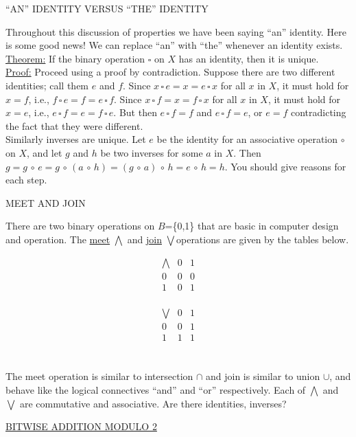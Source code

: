 \documentclass[12pt]{article}
\theoremstyle{definition}
\begin{document}
\centerline{``AN'' IDENTITY VERSUS ``THE'' IDENTITY}
Throughout this discussion of properties we have been saying ``an'' identity.  Here is some good news!  We can replace ``an'' with ``the'' whenever an identity exists.\\[.5in]
\underline{Theorem:} If the binary operation $\square$ on $X$ has an identity, then it is unique.\\
\underline{Proof:} Proceed using a proof by contradiction.  Suppose there are two different identities; call them $e$ and $f$.  Since $x\,\square\, e=x=e\,\square\, x$ for all $x$ in $X$, it must hold for $x=f$, i.e., $f\,\square\, e= f = e\,\square\, f$.  Since $x\,\square\, f=x=f\,\square\, x$ for all $x$ in $X$, it must hold for $x=e$, i.e., $e\,\square\, f=e=f\,\square\, e$.  But then $e\,\square\, f=f$ and $e\,\square\, f =e$, or $e=f$ contradicting the fact that they were different.\\[.1in]

Similarly inverses are  unique.  Let $e$ be the identity for an associative operation $\circ$ on $X$, and let $g$ and $h$ be two inverses for some $a$ in $X$.  Then $g=g\,\circ\, e=g\,\circ\,(a\,\circ\, h)=(g\,\circ\, a)\,\circ\, h=e\,\circ\, h = h$.  You should give reasons for each step.\\[.1in]

\centerline{MEET AND JOIN}
There are two binary operations on $B$=\{0,1\} that are basic in computer design and operation.  The \underline{meet} $\bigwedge$ and \underline{join} $\bigvee$operations are given by the tables below.\\[.3in]
\begin{minipage}{3in}
$$\begin{array}{c|cc}
\bigwedge & 0 & 1\\
\hline
0 & 0 & 0\\
1& 0 & 1\\
\end{array}$$
\end{minipage}
\begin{minipage}{3.5in}
$$\begin{array}{c|cc}
\bigvee & 0 & 1\\
\hline
0 & 0 & 1\\
1& 1 & 1\\
\end{array}$$
\end{minipage}\\[.3in]
The meet operation is similar to intersection $\cap$ and join is similar to union $\cup$, and behave like the logical connectives ``and'' and ``or'' respectively.  Each of $\bigwedge$ and $\bigvee$ are commutative and associative.  Are there identities, inverses?
\newpage
\centerline{\underline{BITWISE ADDITION MODULO 2}}
\end{document}
